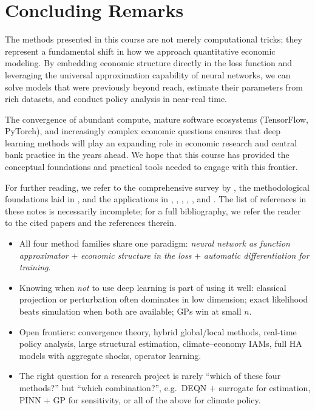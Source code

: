 \documentclass[11pt,a4paper]{report}
\begin{document}
\section{Concluding Remarks}

The methods presented in this course are not merely computational tricks; they represent a fundamental shift in how we approach quantitative economic modeling.  By embedding economic structure directly in the loss function and leveraging the universal approximation capability of neural networks, we can solve models that were previously beyond reach, estimate their parameters from rich datasets, and conduct policy analysis in near-real time.

The convergence of abundant compute, mature software ecosystems (TensorFlow, PyTorch), and increasingly complex economic questions ensures that deep learning methods will play an expanding role in economic research and central bank practice in the years ahead.  We hope that this course has provided the conceptual foundations and practical tools needed to engage with this frontier.

For further reading, we refer to the comprehensive survey by \citet{fernandezvillaverde2024taming}, the methodological foundations laid in \citet{azinovicDEEPEQUILIBRIUMNETS2022}, and the applications in \citet{rennerscheidegger_2018}, \citet{friedlDeep2023}, \citet{han2023deepham}, \citet{payne2024deepsam}, \citet{chen2025Deep}, and \citet{kubler2025using}.  The list of references in these notes is necessarily incomplete; for a full bibliography, we refer the reader to the cited papers and the references therein.

\begin{keyinsightbox}
\begin{itemize}[itemsep=2pt, leftmargin=*]
\item All four method families share one paradigm: \emph{neural network as function approximator} $+$ \emph{economic structure in the loss} $+$ \emph{automatic differentiation for training}.
\item Knowing when \emph{not} to use deep learning is part of using it well: classical projection or perturbation often dominates in low dimension; exact likelihood beats simulation when both are available; GPs win at small $n$.
\item Open frontiers: convergence theory, hybrid global/local methods, real-time policy analysis, large structural estimation, climate--economy IAMs, full HA models with aggregate shocks, operator learning.
\item The right question for a research project is rarely ``which of these four methods?'' but ``which combination?'', e.g.\ DEQN $+$ surrogate for estimation, PINN $+$ GP for sensitivity, or all of the above for climate policy.
\end{itemize}
\end{keyinsightbox}
\end{document}
